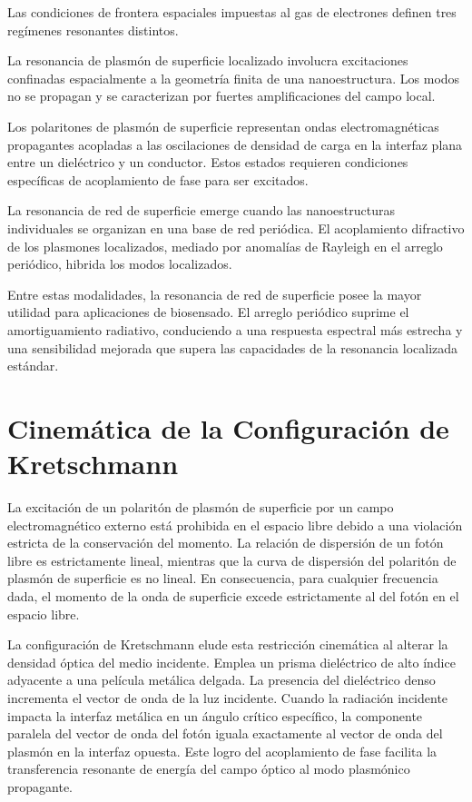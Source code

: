\documentclass[pdflatex,sn-mathphys-num]{sn-jnl}
\theoremstyle{thmstyleone}%
\theoremstyle{thmstyletwo}%
\theoremstyle{thmstylethree}%
\begin{document}
Las condiciones de frontera espaciales impuestas al gas de electrones definen
tres regímenes resonantes distintos.

La resonancia de plasmón de superficie localizado involucra excitaciones
confinadas espacialmente a la geometría finita de una nanoestructura. Los
modos no se propagan y se caracterizan por fuertes amplificaciones del campo
local.

Los polaritones de plasmón de superficie representan ondas electromagnéticas
propagantes acopladas a las oscilaciones de densidad de carga en la interfaz
plana entre un dieléctrico y un conductor. Estos estados requieren
condiciones específicas de acoplamiento de fase para ser excitados.

La resonancia de red de superficie emerge cuando las nanoestructuras
individuales se organizan en una base de red periódica. El acoplamiento
difractivo de los plasmones localizados, mediado por anomalías de Rayleigh en
el arreglo periódico, hibrida los modos localizados.

Entre estas modalidades, la resonancia de red de superficie posee la mayor
utilidad para aplicaciones de biosensado. El arreglo periódico suprime el
amortiguamiento radiativo, conduciendo a una respuesta espectral más estrecha
y una sensibilidad mejorada que supera las capacidades de la resonancia
localizada estándar.

\section{Cinemática de la Configuración de Kretschmann}
\label{sec:kretschmann}

La excitación de un polaritón de plasmón de superficie por un campo
electromagnético externo está prohibida en el espacio libre debido a una
violación estricta de la conservación del momento. La relación de dispersión
de un fotón libre es estrictamente lineal, mientras que la curva de dispersión
del polaritón de plasmón de superficie es no lineal. En consecuencia, para
cualquier frecuencia dada, el momento de la onda de superficie excede
estrictamente al del fotón en el espacio libre.

La configuración de Kretschmann elude esta restricción cinemática al alterar
la densidad óptica del medio incidente. Emplea un prisma dieléctrico de alto
índice adyacente a una película metálica delgada. La presencia del dieléctrico
denso incrementa el vector de onda de la luz incidente. Cuando la radiación
incidente impacta la interfaz metálica en un ángulo crítico específico, la
componente paralela del vector de onda del fotón iguala exactamente al vector
de onda del plasmón en la interfaz opuesta. Este logro del acoplamiento de
fase facilita la transferencia resonante de energía del campo óptico al modo
plasmónico propagante.
\end{document}
